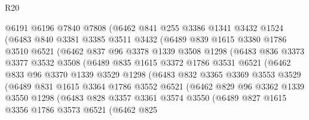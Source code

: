 \begin{lexlean}{R20}
\begin{coremodule}
            @6191
            @6196
            @7840
            @7808
            (@6462
              @841
              @255
              @3386
              @1341
              @3432
              @1524
              (@6483
                @840
                @3381
                @3385
                @3511
                @3432
                (@6489
                  @839
                  @1615
                  @3380
                  @1786
                  @3510
                  @6521
                  (@6462
                    @837
                    @96
                    @3378
                    @1339
                    @3508
                    @1298
                    (@6483
                      @836
                      @3373
                      @3377
                      @3532
                      @3508
                      (@6489
                        @835
                        @1615
                        @3372
                        @1786
                        @3531
                        @6521
                        (@6462
                          @833
                          @96
                          @3370
                          @1339
                          @3529
                          @1298
                          (@6483
                            @832
                            @3365
                            @3369
                            @3553
                            @3529
                            (@6489
                              @831
                              @1615
                              @3364
                              @1786
                              @3552
                              @6521
                              (@6462
                                @829
                                @96
                                @3362
                                @1339
                                @3550
                                @1298
                                (@6483
                                  @828
                                  @3357
                                  @3361
                                  @3574
                                  @3550
                                  (@6489
                                    @827
                                    @1615
                                    @3356
                                    @1786
                                    @3573
                                    @6521
                                    (@6462
                                      @825

\end{coremodule}
\end{lexlean}
